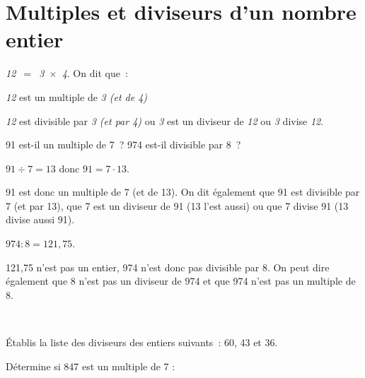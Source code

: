\section{Multiples et diviseurs d'un nombre entier} 


\begin{aconnaitre}
\emph{12 $=$ 3 $\times$ 4}. On dit que :

\textcolor{C2}{\emph{12} est un multiple de \emph{3 (et de 4)}}

\textcolor{A1}{\emph{12} est divisible par \emph{3 (et par 4)}} ou \textcolor{J1}{\emph{3} est un diviseur de \emph{12}} ou \textcolor{H1}{\emph{3} divise \emph{12}}.
\end{aconnaitre}




\begin{methode*1}

\begin{exemple*1}
91 est-il un multiple de 7 ? 974 est-il divisible par 8 ? \\[1em]
\begin{minipage}[t]{0.46\linewidth}
$91 \div 7 = 13$ donc $91 = 7 \cdot 13$.

91 est donc un multiple de 7 (et de 13). On dit également que 91 est divisible par 7 (et par 13), que 7 est un diviseur de 91 (13 l'est aussi) ou que 7 divise 91 (13 divise aussi 91).
 \end{minipage} \hfill%
 \begin{minipage}[t]{0.46\linewidth}
 $974 : 8 = 121,75$.
 
121,75 n'est pas un entier, 974 n'est donc pas divisible par 8. On peut dire également que 8 n'est pas un diviseur de 974 et que 974 n'est pas un multiple de 8.
\end{minipage} \\

\end{exemple*1}

\exercice 
Établis la liste des diviseurs des entiers suivants : 60, 43 et 36.




\exercice 
Détermine si 847 est un multiple de 7 :



\end{methode*1}

